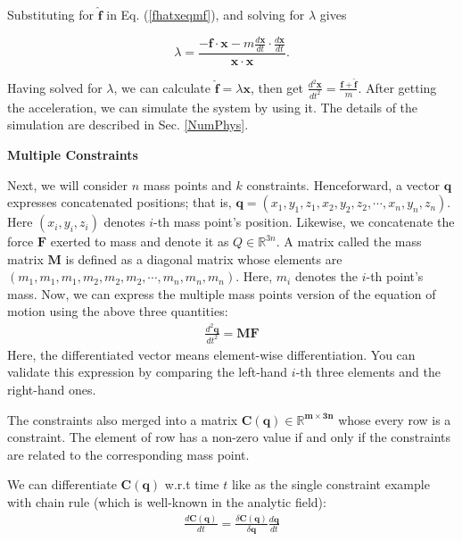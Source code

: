 \documentclass[pdflatex,sn-mathphys-num]{sn-jnl}%
\theoremstyle{thmstyleone}%
\theoremstyle{thmstyletwo}%
\theoremstyle{thmstylethree}%
\begin{document}
Substituting for $\boldsymbol{\hat{f}}$ in Eq. (\ref{fhatxeqmf}), and solving for $\lambda$ gives

\begin{equation}
	\lambda = \frac{-\boldsymbol{f}\cdot\boldsymbol{x} - m \frac{d\boldsymbol{x}}{dt}\cdot\frac{d\boldsymbol{x}}{dt}}{\boldsymbol{x} \cdot\boldsymbol{x}}.
\end{equation}

Having solved for $\lambda$, we can calculate $\boldsymbol{\hat{f}} = \lambda\boldsymbol{x}$, then get $\frac{d^2 \boldsymbol{x}}{dt^2} = \frac{\boldsymbol{f}+\boldsymbol{\hat{f}}}{m}$. After getting the acceleration, we can simulate the system by using it. The details of the simulation are described in Sec. \ref{NumPhys}.

\textbf{\noindent Multiple Constraints}

Next, we will consider $n$ mass points and $k$ constraints.
Henceforward, a vector $\boldsymbol{q}$ expresses concatenated positions; that is, $\boldsymbol{q} = (x_1, y_1, z_1, x_2, y_2, z_2, \cdots, x_n, y_n, z_n)$. Here $(x_i, y_i, z_i)$ denotes $i$-th mass point's position. Likewise, we concatenate the force $\boldsymbol{F}$ exerted to mass and denote it as $Q \in \mathbb{R}^{3n}$.
A matrix called the mass matrix $\boldsymbol{M}$ is defined as a diagonal matrix whose elements are $(m_1, m_1, m_1, m_2, m_2, m_2, \cdots, m_n, m_n, m_n)$. Here, $m_i$ denotes the $i$-th point's mass.
Now, we can express the multiple mass points version of the equation of motion using the above three quantities:
\begin{eqnarray}
	\frac{d^2\boldsymbol{q}}{dt^2} = \boldsymbol{M} \boldsymbol{F}
\end{eqnarray}
Here, the differentiated vector means element-wise differentiation.
You can validate this expression by comparing the left-hand $i$-th three elements and the right-hand ones.

The constraints also merged into a matrix $\boldsymbol{C(q)\in \mathbb{R}^{m\times 3n}}$ whose every row is a constraint. The element of row has a non-zero value if and only if the constraints are related to the corresponding mass point.

We can differentiate $\boldsymbol{C(q)}$ w.r.t time $t$ like as the single constraint example with chain rule (which is well-known in the analytic field):
\begin{eqnarray}
	\frac{d\boldsymbol{C(q)}}{dt} = \frac{\delta \boldsymbol{C(q)}}{\delta \boldsymbol{q}}\frac{d\boldsymbol{q}}{dt}
\end{eqnarray}
\end{document}
